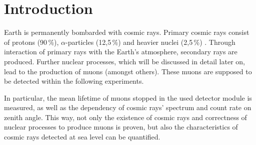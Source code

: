 \section{Introduction}

Earth is permanently bombarded with cosmic rays. Primary cosmic rays consist of protons (90\,\%), $\alpha$-particles (12,5\,\%) and heavier nuclei (2,5\,\%) \cite{wwu}. Through interaction of primary rays with the Earth's atmosphere, secondary rays are produced. Further nuclear processes, which will be discussed in detail later on, lead to the production of muons (amongst others). These muons are supposed to be detected within the following experiments.

In particular, the mean lifetime of muons stopped in the used detector module is measured, as well as the dependency of cosmic rays' spectrum and count rate on zenith angle. This way, not only the existence of cosmic rays and correctness of nuclear processes to produce muons is proven, but also the characteristics of cosmic rays detected at sea level can be quantified.



